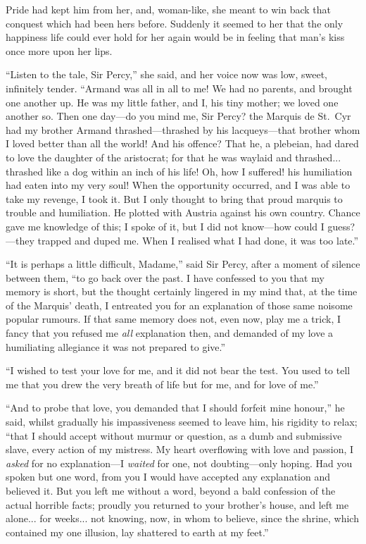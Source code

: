 \documentclass[paper=a5,BCOR=7mm,twoside,DIV=calc,12pt,usegeometry,chapterprefix,endperiod,headings=big]{scrbook}
\begin{document}
Pride had kept him from her, and, woman-like, she meant to win back that conquest which had been hers before. Suddenly it seemed to her that the only happiness life could ever hold for her again would be in feeling that man's kiss once more upon her lips.

\enquote{Listen to the tale, Sir Percy,} she said, and her voice now was low, sweet, infinitely tender. \enquote{Armand was all in all to me! We had no parents, and brought one another up. He was my little father, and I, his tiny mother; we loved one another so. Then one day---do you mind me, Sir Percy? the Marquis de St.~Cyr had my brother Armand thrashed---thrashed by his lacqueys---that brother whom I loved better than all the world! And his offence? That he, a plebeian, had dared to love the daughter of the aristocrat; for that he was waylaid and thrashed... thrashed like a dog within an inch of his life! Oh, how I suffered! his humiliation had eaten into my very soul! When the opportunity occurred, and I was able to take my revenge, I took it. But I only thought to bring that proud marquis to trouble and humiliation. He plotted with Austria against his own country. Chance gave me knowledge of this; I spoke of it, but I did not know---how could I guess?---they trapped and duped me. When I realised what I had done, it was too late.}

\enquote{It is perhaps a little difficult, Madame,} said Sir Percy, after a moment of silence between them, \enquote{to go back over the past. I have confessed to you that my memory is short, but the thought certainly lingered in my mind that, at the time of the Marquis’ death, I entreated you for an explanation of those same noisome popular rumours. If that same memory does not, even now, play me a trick, I fancy that you refused me \textit{all} explanation then, and demanded of my love a humiliating allegiance it was not prepared to give.}

\enquote{I wished to test your love for me, and it did not bear the test. You used to tell me that you drew the very breath of life but for me, and for love of me.}

\enquote{And to probe that love, you demanded that I should forfeit mine honour,} he said, whilst gradually his impassiveness seemed to leave him, his rigidity to relax; \enquote{that I should accept without murmur or question, as a dumb and submissive slave, every action of my mistress. My heart overflowing with love and passion, I \textit{asked} for no explanation---I \textit{waited} for one, not doubting---only hoping. Had you spoken but one word, from you I would have accepted any explanation and believed it. But you left me without a word, beyond a bald confession of the actual horrible facts; proudly you returned to your brother's house, and left me alone... for weeks... not knowing, now, in whom to believe, since the shrine, which contained my one illusion, lay shattered to earth at my feet.}
\end{document}
